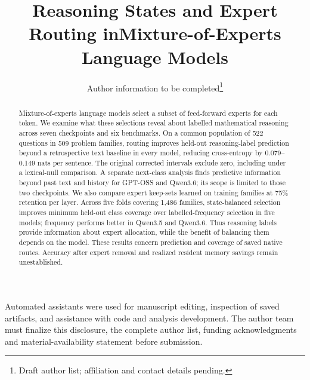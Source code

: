 \documentclass[final]{clv2025}
\begin{document}
\title{Reasoning States and Expert Routing in\newline Mixture-of-Experts Language Models}
\author{Author information to be completed\thanks{Draft author list; affiliation and contact details pending.}}
\maketitle

\begin{abstract}
Mixture-of-experts language models select a subset of feed-forward experts
for each token. We examine what these selections reveal about labelled
mathematical reasoning across seven checkpoints and six benchmarks.
On a common population of 522 questions in 509 problem families, routing
improves held-out reasoning-label prediction beyond a retrospective text
baseline in every model, reducing cross-entropy by 0.079--0.149 nats per
sentence. The original corrected intervals exclude zero, including under
a lexical-null comparison. A separate next-class analysis finds predictive
information beyond past text and history for GPT-OSS and Qwen3.6; its scope
is limited to those two checkpoints. We also compare expert keep-sets
learned on training families at 75\% retention per layer. Across five folds
covering 1,486 families, state-balanced selection improves minimum held-out
class coverage over labelled-frequency selection in five models; frequency
performs better in Qwen3.5 and Qwen3.6. Thus reasoning labels provide
information about expert allocation, while the benefit of balancing them
depends on the model. These results concern prediction and coverage of
saved native routes. Accuracy after expert removal and realized resident
memory savings remain unestablished.
\end{abstract}



\begin{acknowledgments}
Automated assistants were used for manuscript editing, inspection of saved
artifacts, and assistance with code and analysis development. The author
team must finalize this disclosure, the complete author list, funding
acknowledgments and material-availability statement before submission.
\end{acknowledgments}
\end{document}

